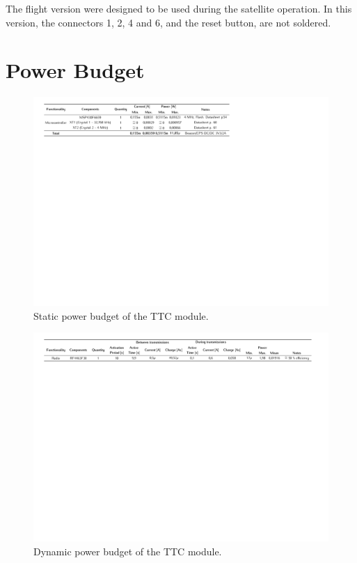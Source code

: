 The flight version were designed to be used during the satellite operation. In this version, the connectors 1, 2, 4 and 6, and the reset button, are not soldered.

\section{Power Budget}

\begin{figure}[!h]
	\begin{center}
		\includegraphics[width=\textwidth]{figures/power_budget_static.pdf}
		\caption{Static power budget of the TTC module.}
		\label{fig:power-budget-static}
	\end{center}
\end{figure}

\begin{figure}[!h]
	\begin{center}
		\includegraphics[width=\textwidth]{figures/power_budget_dynamic.pdf}
		\caption{Dynamic power budget of the TTC module.}
		\label{fig:power-budget-dynamic}
	\end{center}
\end{figure}
